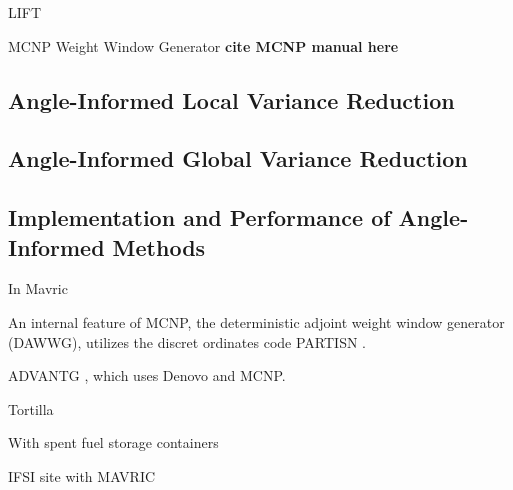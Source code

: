 LIFT \cite{turner_automatic_1997, turner_automatic_1997-1}

MCNP Weight Window Generator \textbf{cite MCNP manual here}

\subsection{Angle-Informed Local Variance Reduction}

\subsection{Angle-Informed Global Variance Reduction}

\subsection{Implementation and Performance of Angle-Informed Methods}
\label{sec:results}

In Mavric \cite{peplow_advanced_2007}

An internal feature of MCNP, the deterministic adjoint weight window generator (DAWWG), utilizes the discret ordinates code PARTISN \cite{sweezy_automated_2005}. 

ADVANTG \cite{mosher_new_2010, wagner_review_2011, bevill_new_2012}, which uses Denovo \cite{evans_denovo:_2010-1} and MCNP. 

Tortilla \cite{somasundaram_implementation_2013}

With spent fuel storage containers \cite{chen_surface_2011}

IFSI site with MAVRIC \cite{sheu_dose_2011}
